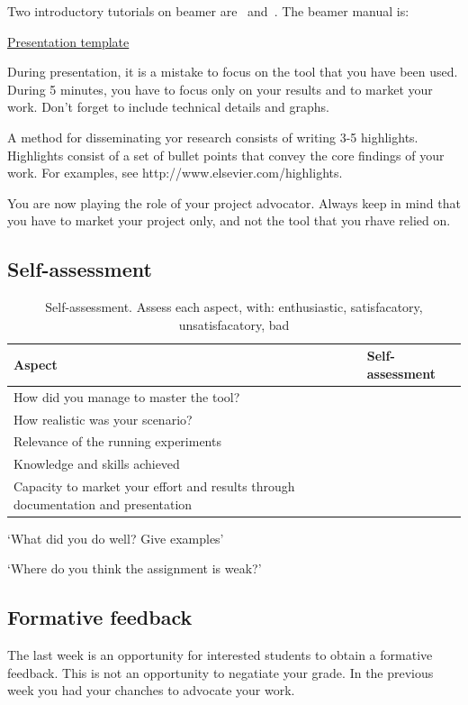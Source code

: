 \documentclass[a4paper,12pt]{report}
\begin{document}
Two introductory tutorials on beamer are~\cite{mertz2005beamer} and~\cite{batts2007beamer}.
The beamer manual is: 

\href{http://cs-gw.utcluj.ro/~srazvan/articleSchema.tgz}{Presentation template}

During presentation, it is a mistake to focus on the tool that you have been used. 
During 5 minutes, you have to focus only on your results and to market your work.
Don't forget to include technical details and graphs.

A method for disseminating yor research consists of writing 3-5 highlights.
Highlights consist of a set of bullet points 
that convey the core findings of your work.
For examples, see http://www.elsevier.com/highlights.

You are now playing the role of your project advocator. 
Always keep in mind that you have to market your project only, and not the tool that you rhave relied on.



\subsection{Self-assessment}

\begin{table}
\begin{tabular}{p{8cm}l}
Aspect & Self-assessment\\ \hline
How did you manage to master the tool?& \\
How realistic was your scenario? & \\
Relevance of the running experiments &\\
Knowledge and skills achieved & \\ 
Capacity to market your effort and results through documentation and presentation& \\
\hline
\end{tabular}
\caption{Self-assessment. Assess each aspect, with: enthusiastic, satisfacatory, unsatisfacatory, bad} 
\end{table}

‘What did you do well? Give examples’

‘Where do you think the assignment is weak?’


\subsection{Formative feedback}
The last week is an opportunity for interested students to obtain 
a formative feedback. 
This is not an opportunity to negatiate your grade. 
In the previous week you had your chanches to advocate your work. 
\end{document}
